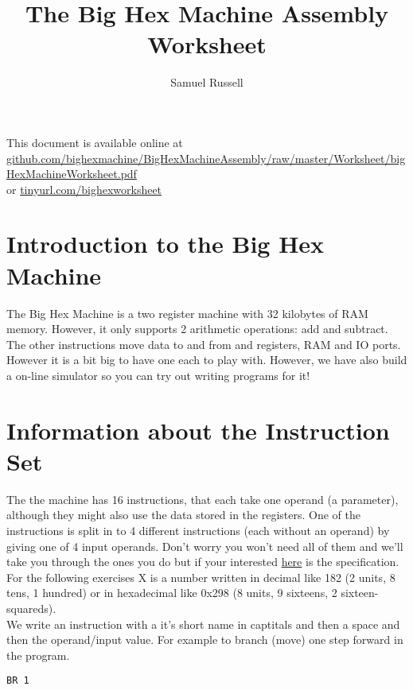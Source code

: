 \documentclass[10pt,a4paper]{article}
\author{Samuel Russell}
\title{The Big Hex Machine Assembly Worksheet}
\begin{document}
\maketitle

This document is available online at\\ \href{http://github.com/bighexmachine/BigHexMachineAssembly/raw/master/Worksheet/bigHexMachineWorksheet.pdf}{github.com/bighexmachine/BigHexMachineAssembly/raw/master/Worksheet/bigHexMachineWorksheet.pdf}\\or \href{http://tinyurl.com/bighexworksheet}{tinyurl.com/bighexworksheet}

\section{Introduction to the Big Hex Machine}
The Big Hex Machine is a two register machine with 32 kilobytes of RAM memory. However, it only supports 2 arithmetic operations: add and subtract. The other instructions move data to and from and registers, RAM and IO ports. However it is a bit big to have one each to play with. However, we have also build a on-line simulator so you can try out writing programs for it!

\section{Information about the Instruction Set}
The the machine has 16 instructions, that each take one operand (a parameter), although they might also use the data stored in the registers. One of the instructions is split in to 4 different instructions (each without an operand) by giving one of 4 input operands. Don't worry you won't need all of them and we'll take you through the ones you do but if your interested \href{https://bighexmachine.github.io/BigHexOnlineSimulator/assemblySpec.pdf}{here} is the specification.\\

For the following exercises X is a number written in decimal like 182 (2 units, 8 tens, 1 hundred) or in hexadecimal like 0x298 (8 units, 9 sixteens, 2 sixteen-squareds).\\

We write an instruction with a it's short name in captitals and then a space and then the operand/input value. For example to branch (move) one step forward in the program.
\begin{lstlisting}[frame=single]
BR 1
\end{lstlisting}
\end{document}
